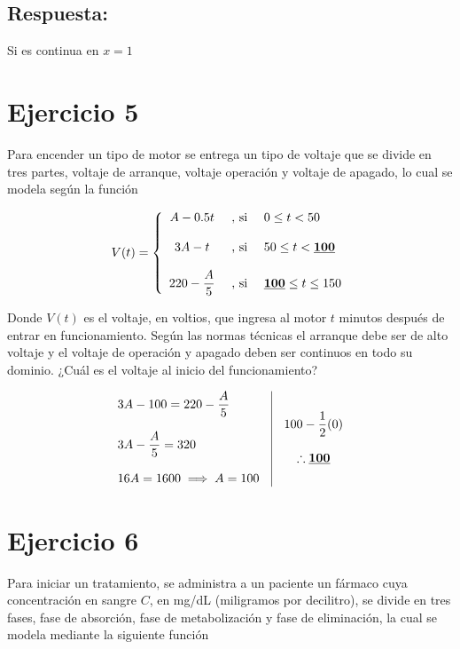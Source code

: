 \documentclass[12pt]{article}
\begin{document}
\subsection*{Respuesta:} \noindent Si es continua en $x=1$





\section*{Ejercicio 5}
\noindent Para encender un tipo de motor se entrega un tipo de voltaje que se divide en tres partes, 
voltaje de arranque, voltaje operación y voltaje de apagado, lo cual se modela según la función

\[
V(t) = 
\left\{
  \begin{array}{c l l}
    A - 0.5t & \text{ , si } & 0 \leq t < 50 \\\\
    3A - t & \text{ , si } & 50 \leq t < \textbf{\underline{100}} \\\\
    220 - \dfrac{A}{5} & \text{ , si } & \textbf{\underline{100}} \leq t \leq 150
  \end{array}
\right.
\]

\noindent Donde $V(t)$ es el voltaje, en voltios, que ingresa al motor $t$ minutos después de entrar en
funcionamiento. Según las normas técnicas el arranque debe ser de alto voltaje y el voltaje de operación 
y apagado deben ser continuos en todo su dominio. ¿Cuál es el voltaje al inicio del funcionamiento?

\[
\begin{array}{l|c}
  \begin{array}{l}
    3A - 100 = 220 - \dfrac{A}{5} \\\\
    3A - \dfrac{A}{5} = 320 \\\\
    16A = 1600 \implies A = 100
  \end{array}
  &
  \begin{array}{c}
    100 - \dfrac{1}{2}(0) \\\\
    \therefore \textbf{\underline{100}}
  \end{array}
\end{array}
\]





\newpage
\section*{Ejercicio 6}
\noindent Para iniciar un tratamiento, se administra a un paciente un fármaco cuya concentración en sangre $C$,
en mg/dL (miligramos por decilitro), se divide en tres fases, fase de absorción, fase de metabolización y fase 
de eliminación, la cual se modela mediante la siguiente función
\end{document}
